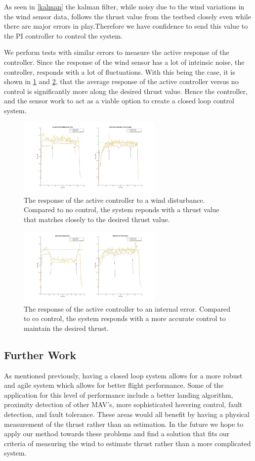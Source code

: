 \documentclass[conference]{IEEEtran}
\begin{document}
 As seen in \ref{kalman} the kalman filter, while noisy due to the wind variations in the wind sensor data, follows the thrust value from the testbed closely even while there are major errors in play.Therefore we have confidence to send this value to the PI controller to control the system. 
 
We perform tests with similar errors to measure the active response of the controller. Since the response of the wind sensor has a lot of intrinsic noise, the controller, responds with a lot of fluctuations. With this being the case, it is shown in \ref{wind_disturbance} and \ref{PWM_control}, that the average response of the active controller versus no control is significantly more along the desired thrust value. Hence the controller, and the sensor work to act as a viable option to create a closed loop control system.
\begin{figure}[htbp]
	\includegraphics[width=7cm]{images/Figure_2/wind_ctl.jpg}
	\caption{The response of the active controller to a wind disturbance. Compared to no control, the system reponds with a thrust value that matches closely to the desired thrust value.}
	\label{wind_disturbance}
	\end{figure}
\begin{figure}[htbp]
	\includegraphics[width=7cm]{images/Figure_2/pwm_control.jpg}
	\caption{The response of the active controller to an internal error. Compared to co control, the system responds with a more accurate control to maintain the desired thrust.}
	\label{PWM_control}
\end{figure}

\subsection{Further Work}
As mentioned previously, having a closed loop system allows for a more robust and agile system which allows for better flight performance. Some of the application for this level of performance include a better landing algorithm, proximity detection of other MAV's, more sophisticated hovering control, fault detection, and fault tolerance. These areas would all benefit by having a physical measurement of the thrust rather than an estimation. In the future we hope to apply our method towards these problems and find a solution that fits our criteria of measuring the wind to estimate thrust rather than a more complicated system.
\end{document}
